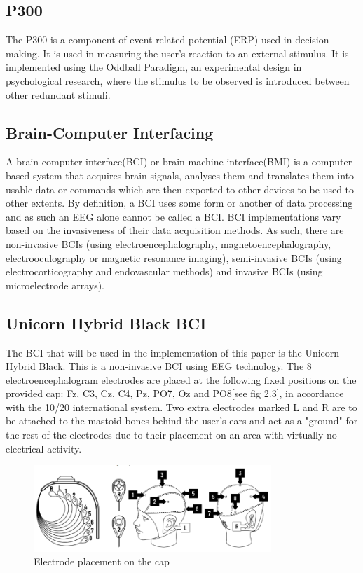 \subsection{P300}
The P300 is a component of event-related potential (ERP) used in decision-making. It is used in measuring the user's reaction to an external stimulus. It is implemented using the Oddball Paradigm, an experimental design in psychological research, where the stimulus to be observed is introduced between other redundant stimuli.

\subsection{Brain-Computer Interfacing}
A brain-computer interface(BCI) or brain-machine interface(BMI) is a computer-based system that acquires brain signals, analyses them and translates them into usable data or commands which are then exported to other devices to be used to other extents. By definition, a BCI uses some form or another of data processing and as such an EEG alone cannot be called a BCI\cite{Shih_2012}. BCI implementations vary based on the invasiveness of their data acquisition methods. As such, there are non-invasive BCIs (using electroencephalography, magnetoencephalography, electrooculography or magnetic resonance imaging), semi-invasive BCIs (using electrocorticography and endovascular methods) and invasive BCIs (using microelectrode arrays).

\subsection{Unicorn Hybrid Black BCI}
The BCI that will be used in the implementation of this paper is the Unicorn Hybrid Black. This is a non-invasive BCI using EEG technology. The 8 electroencephalogram electrodes are placed at the following fixed positions on the provided cap: Fz, C3, Cz, C4, Pz, PO7, Oz and PO8[see fig 2.3], in accordance with the 10/20 international system. Two extra electrodes marked L and R are to be attached to the mastoid bones behind the user's ears and act as a "ground" for the rest of the electrodes due to their placement on an area with virtually no electrical activity. 

\begin{figure}[H]
  \centering
  \includegraphics[width=0.8\textwidth]{Graphics/Electrode Placement.png}
  \caption{Electrode placement on the cap}
\end{figure}

